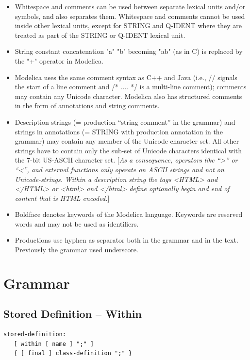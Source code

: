 \documentclass[10pt,a4paper]{report}
\def\doublelabel#1{\label{#1}}
\begin{document}
\begin{itemize}
\item
  Whitespace and comments can be used between separate lexical units
  and/or symbols, and also separates them. Whitespace and comments
  cannot be used inside other lexical units, except for STRING and
  Q-IDENT where they are treated as part of the STRING or Q-IDENT
  lexical unit.
\item
  String constant concatenation "a" "b" becoming "ab" (as in C) is
  replaced by the "+" operator in Modelica.
\item
  Modelica uses the same comment syntax as C++ and Java (i.e., //
  signals the start of a line comment and /* .... */ is a multi-line
  comment); comments may contain any Unicode character. Modelica also
  has structured comments in the form of annotations and string
  comments.
\item
  Description strings (= production ``string-comment'' in the grammar)
  and strings in annotations (= STRING with production annotation in the
  grammar) may contain any member of the Unicode character set. All
  other strings have to contain only the sub-set of Unicode characters
  identical with the 7-bit US-ASCII character set. {[}\emph{As a
  consequence, operators like ``\textgreater{}'' or ``\textless{}'', and
  external functions only operate on ASCII strings and not on
  Unicode-strings.} \emph{Within a description string the tags
  \textless{}HTML\textgreater{} and \textless{}/HTML\textgreater{} or
  \textless{}html\textgreater{} and \textless{}/html\textgreater{}
  define optionally begin and end of content that is HTML encoded.}{]}
\item
  Boldface denotes keywords of the Modelica language. Keywords are
  reserved words and may not be used as identifiers.
\item
  Productions use hyphen as separator both in the grammar and in the
  text. Previously the grammar used underscore.
\end{itemize}

\section{Grammar}\doublelabel{grammar}
\subsection{Stored Definition -- Within}\doublelabel{stored-definition-within}
\begin{lstlisting}[language=grammar]
stored-definition:    
   [ within [ name ] ";" ]    
   { [ final ] class-definition ";" } 
\end{lstlisting}
\end{document}
